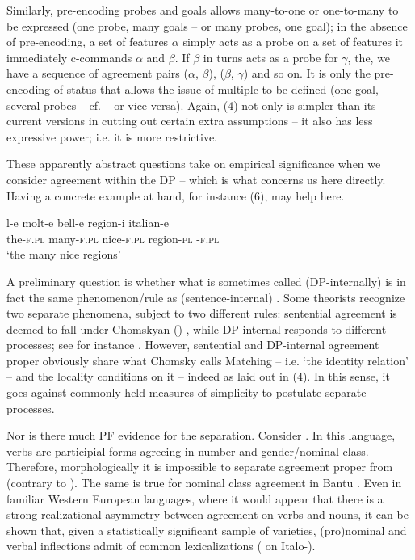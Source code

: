 \documentclass[output=paper]{langsci/langscibook}
\begin{document}
Similarly, pre-encoding probes and goals allows many-to-one or one-to-many  to be expressed (one probe, many goals – or many probes, one goal); in the absence of pre-encoding, a set of features $\alpha $ simply acts as a probe on a set of features it immediately c-commands $\alpha $ and $\beta $. If $\beta $ in turns acts as a probe for $\gamma $, the, we have a sequence of agreement pairs ($\alpha $, $\beta $), ($\beta $, $\gamma $) and so on. It is only the pre-encoding of  status that allows the issue of multiple  to be defined (one goal, several probes – cf. \citealt{Carstens2001} – or vice versa). Again, (4) not only is simpler than its current versions in cutting out certain extra assumptions – it also has less expressive power; i.e. it is more restrictive.

These apparently abstract questions take on empirical significance when we consider agreement within the DP – which is what concerns us here directly. Having a concrete example at hand, for instance  (6), may help here. 

\ea%
    \label{ex:manzini:6}
    \gll l-e    molt-e   bell-e    region-i  italian-e\\
         the-\textsc{f.pl}   many-\textsc{f.pl}   nice-\textsc{f.pl}   region-\textsc{pl}    -\textsc{f.pl} \\
    \glt ‘the many nice  regions’
\z

A preliminary question is whether what is sometimes called  (DP-internally) is in fact the same phenomenon\slash rule as (sentence-internal) . Some theorists recognize two separate phenomena, subject to two different rules: sentential agreement is deemed to fall under Chomskyan () , while DP-internal  responds to different processes; see for instance \citet{Giusti2008}. However, sentential and DP-internal agreement proper obviously share what Chomsky calls Matching – i.e. ‘the identity relation’ – and the locality conditions on it – indeed as laid out in (4). In this sense, it goes against commonly held measures of simplicity to postulate separate processes. 

Nor is there much PF evidence for the separation. Consider . In this language, verbs are participial forms agreeing in number and gender\slash nominal class. Therefore, morphologically it is impossible to separate agreement proper from  (contrary to ). The same is true for nominal class agreement in Bantu \citep{Baker2008}. Even in familiar Western European languages, where it would appear that there is a strong realizational asymmetry between agreement on verbs and nouns, it can be shown that, given a statistically significant sample of varieties, (pro)nominal and verbal inflections admit of common lexicalizations (\citealt{Manzini2007} on Italo-).
\end{document}
